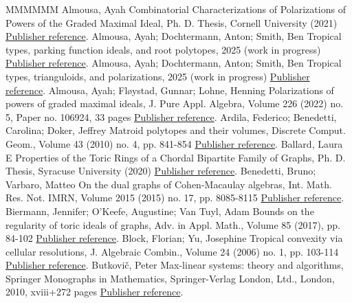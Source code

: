 \begin{thebibliography}{MMMMMM}
 Almousa, Ayah Combinatorial Characterizations of Polarizations of Powers of the Graded Maximal Ideal, Ph. D. Thesis, Cornell University (2021) \href{https://alco.centre-mersenne.org/articles/10.5802/alco.404/#almousa2021combinatorial}{Publisher reference}.
 Almousa, Ayah; Dochtermann, Anton; Smith, Ben Tropical types, parking function ideals, and root polytopes, 2025 (work in progress) \href{https://alco.centre-mersenne.org/articles/10.5802/alco.404/#ADSparking}{Publisher reference}.
 Almousa, Ayah; Dochtermann, Anton; Smith, Ben Tropical types, trianguloids, and polarizations, 2025 (work in progress) \href{https://alco.centre-mersenne.org/articles/10.5802/alco.404/#ADSpolarizations}{Publisher reference}.
 Almousa, Ayah; Fløystad, Gunnar; Lohne, Henning Polarizations of powers of graded maximal ideals, J. Pure Appl. Algebra, Volume 226 (2022) no. 5, Paper no. 106924, 33 pages \href{https://alco.centre-mersenne.org/articles/10.5802/alco.404/#almousa2019polarizations}{Publisher reference}.
 Ardila, Federico; Benedetti, Carolina; Doker, Jeffrey Matroid polytopes and their volumes, Discrete Comput. Geom., Volume 43 (2010) no. 4, pp. 841-854 \href{https://alco.centre-mersenne.org/articles/10.5802/alco.404/#ArdBenDok}{Publisher reference}.
 Ballard, Laura E Properties of the Toric Rings of a Chordal Bipartite Family of Graphs, Ph. D. Thesis, Syracuse University (2020) \href{https://alco.centre-mersenne.org/articles/10.5802/alco.404/#ballard2021properties}{Publisher reference}.
 Benedetti, Bruno; Varbaro, Matteo On the dual graphs of Cohen-Macaulay algebras, Int. Math. Res. Not. IMRN, Volume 2015 (2015) no. 17, pp. 8085-8115 \href{https://alco.centre-mersenne.org/articles/10.5802/alco.404/#BenVar}{Publisher reference}.
 Biermann, Jennifer; O’Keefe, Augustine; Van Tuyl, Adam Bounds on the regularity of toric ideals of graphs, Adv. in Appl. Math., Volume 85 (2017), pp. 84-102 \href{https://alco.centre-mersenne.org/articles/10.5802/alco.404/#BieOkeVan17}{Publisher reference}.
 Block, Florian; Yu, Josephine Tropical convexity via cellular resolutions, J. Algebraic Combin., Volume 24 (2006) no. 1, pp. 103-114 \href{https://alco.centre-mersenne.org/articles/10.5802/alco.404/#block2006tropical}{Publisher reference}.
 Butkovič, Peter Max-linear systems: theory and algorithms, Springer Monographs in Mathematics, Springer-Verlag London, Ltd., London, 2010, xviii+272 pages \href{https://alco.centre-mersenne.org/articles/10.5802/alco.404/#butkovic}{Publisher reference}.

\end{thebibliography}

